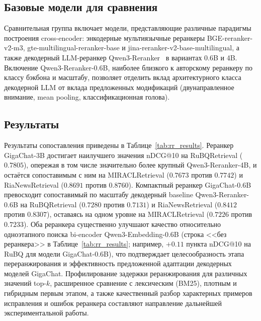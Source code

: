 \subsection{Базовые модели для сравнения}\label{subsec:rr_baselines}

Сравнительная группа включает модели, представляющие различные парадигмы построения cross-encoder: энкодерные мультиязычные реранкеры BGE-reranker-v2-m3, gte-multilingual-reranker-base и jina-reranker-v2-base-multilingual, а также декодерный LLM-реранкер Qwen3-Reranker~\cite{2506.05176} в вариантах 0.6B и 4B.
Включение Qwen3-Reranker-0.6B, наиболее близкого к авторскому реранкеру по классу бэкбона и масштабу, позволяет отделить вклад архитектурного класса декодерной LLM от вклада предложенных модификаций (двунаправленное внимание, mean pooling, классификационная голова).

\subsection{Результаты}\label{subsec:rr_results}

Результаты сопоставления приведены в Таблице~\ref{tab:rr_results}.
Реранкер GigaChat-3B достигает наилучшего значения nDCG@10 на RuBQRetrieval ($0.7805$), опережая в том числе значительно более крупный Qwen3-Reranker-4B, и остаётся сопоставимым с ним на MIRACLRetrieval ($0.7673$ против $0.7742$) и RiaNewsRetrieval ($0.8691$ против $0.8760$).
Компактный реранкер GigaChat-0.6B превосходит сопоставимый по масштабу декодерный baseline Qwen3-Reranker-0.6B на RuBQRetrieval ($0.7280$ против $0.7131$) и RiaNewsRetrieval ($0.8412$ против $0.8307$), оставаясь на одном уровне на MIRACLRetrieval ($0.7226$ против $0.7233$).
Оба реранкера существенно улучшают качество относительно одноэтапного поиска bi-encoder Qwen3-Embedding-0.6B (строка <<без реранкера>> в Таблице~\ref{tab:rr_results}; например, $+0.11$ пункта nDCG@10 на RuBQ для модели GigaChat-0.6B), что подтверждает целесообразность этапа переранжирования и эффективность предложенной адаптации декодерных моделей GigaChat.
Профилирование задержки реранжирования для различных значений top-$k$, расширенное сравнение с лексическим (BM25), плотным и гибридным первым этапом, а также качественный разбор характерных примеров исправления и ошибок реранкера составляют направление дальнейшей экспериментальной работы.

